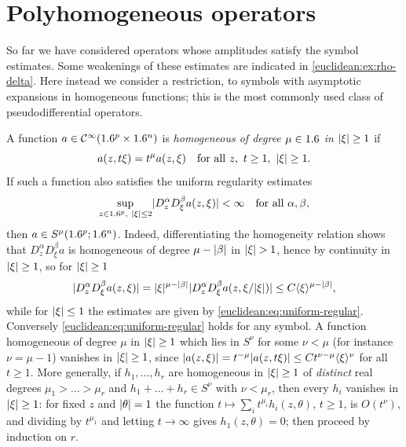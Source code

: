\section{Polyhomogeneous operators}\label{euclidean:sec:polyhomogeneous}

So far we have considered operators whose amplitudes satisfy the symbol
estimates. Some weakenings of these estimates are indicated in
\cref{euclidean:ex:rho-delta}. Here instead we consider a restriction, to
symbols with asymptotic expansions in homogeneous functions; this is the
most commonly used class of pseudodifferential operators.

A function $a\in\mathcal{C}^\infty(1.6^p\times1.6^n)$ is \emph{homogeneous of degree
$\mu\in1.6$ in $\lvert \xi\rvert\ge1$} if
\begin{equation*}
  a(z,t\xi)=t^\mu a(z,\xi)\quad\text{for all }z,\ t\ge1,\ \abs\xi\ge1.
\end{equation*}
If such a function also satisfies the uniform regularity estimates
\begin{equation}\label{euclidean:eq:uniform-regular}
  \sup_{z\in1.6^p,\ \lvert \xi\rvert\le2}\lvert D^\alpha_zD^\beta_\xi a(z,\xi)\rvert<\infty
  \quad\text{for all }\alpha,\beta,
\end{equation}
then $a\in S^\mu(1.6^p;1.6^n)$. Indeed, differentiating the homogeneity relation
shows that $D^\alpha_zD^\beta_\xi a$ is homogeneous of degree $\mu-\lvert \beta\rvert$
in $\lvert \xi\rvert>1$, hence by continuity in $\lvert \xi\rvert\ge1$, so for $\lvert \xi\rvert\ge1$
\begin{equation*}
  \lvert D^\alpha_zD^\beta_\xi a(z,\xi)\rvert=\lvert \xi\rvert^{\mu-\lvert \beta\rvert}
  \lvert D^\alpha_zD^\beta_\xi a(z,\xi/\lvert \xi\rvert)\rvert\le C\langle \xi\rangle^{\mu-\lvert \beta\rvert},
\end{equation*}
while for $\lvert \xi\rvert\le1$ the estimates are given by
\eqref{euclidean:eq:uniform-regular}. Conversely
\eqref{euclidean:eq:uniform-regular} holds for any symbol. A function
homogeneous of degree $\mu$ in $\lvert \xi\rvert\ge1$ which lies in $S^{\nu}$ for some
$\nu<\mu$ (for instance $\nu=\mu-1$) vanishes in $\lvert \xi\rvert\ge1$, since
$\lvert a(z,\xi)\rvert=t^{-\mu}\lvert a(z,t\xi)\rvert\le Ct^{\nu-\mu}\langle \xi\rangle^{\nu}$ for all $t\ge1$.
More generally, if $h_1,\dots,h_r$ are homogeneous in $\lvert \xi\rvert\ge1$ of
\emph{distinct} real degrees $\mu_1>\dots>\mu_r$ and
$h_1+\dots+h_r\in S^\nu$ with $\nu<\mu_r$, then every $h_i$ vanishes in
$\lvert \xi\rvert\ge1$: for fixed $z$ and $\lvert \theta\rvert=1$ the function
$t\mapsto\sum_it^{\mu_i}h_i(z,\theta)$, $t\ge1$, is $O(t^\nu)$, and dividing by
$t^{\mu_1}$ and letting $t\to\infty$ gives $h_1(z,\theta)=0$; then proceed by
induction on $r$.

